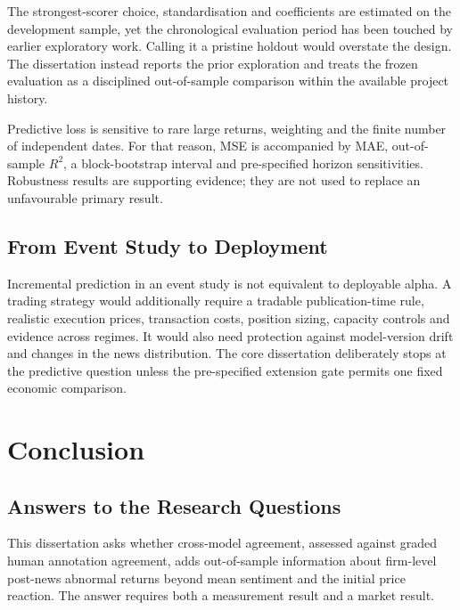 \documentclass[11pt,a4paper,oneside]{book}
\newif\ifshowdraftnotes
\newcommand{\draftnote}[1]{%
  \ifshowdraftnotes
    \par\smallskip
    \noindent{\color{draftgrey}\small\itshape Drafting note: #1\par}
    \smallskip
  \fi
}
\begin{document}
The strongest-scorer choice, standardisation and coefficients are estimated on the development sample, yet the chronological evaluation period has been touched by earlier exploratory work.
Calling it a pristine holdout would overstate the design.
The dissertation instead reports the prior exploration and treats the frozen evaluation as a disciplined out-of-sample comparison within the available project history.

Predictive loss is sensitive to rare large returns, weighting and the finite number of independent dates.
For that reason, MSE is accompanied by MAE, out-of-sample $R^2$, a block-bootstrap interval and pre-specified horizon sensitivities.
Robustness results are supporting evidence; they are not used to replace an unfavourable primary result.

\section{From Event Study to Deployment}
\label{sec:discussion-deployment}

Incremental prediction in an event study is not equivalent to deployable alpha.
A trading strategy would additionally require a tradable publication-time rule, realistic execution prices, transaction costs, position sizing, capacity controls and evidence across regimes.
It would also need protection against model-version drift and changes in the news distribution.
The core dissertation deliberately stops at the predictive question unless the pre-specified extension gate permits one fixed economic comparison.

\chapter{Conclusion}
\label{ch:conclusion}

\section{Answers to the Research Questions}
\label{sec:conclusion-answers}

This dissertation asks whether cross-model agreement, assessed against graded human annotation agreement, adds out-of-sample information about firm-level post-news abnormal returns beyond mean sentiment and the initial price reaction.
The answer requires both a measurement result and a market result.

\draftnote{Replace this note with three concise evidence-backed paragraphs: the answer to Supporting Question 1, the answer to Supporting Question 2, and the resulting answer to the primary research question. Include the main estimates and uncertainty without introducing new evidence.}
\end{document}
